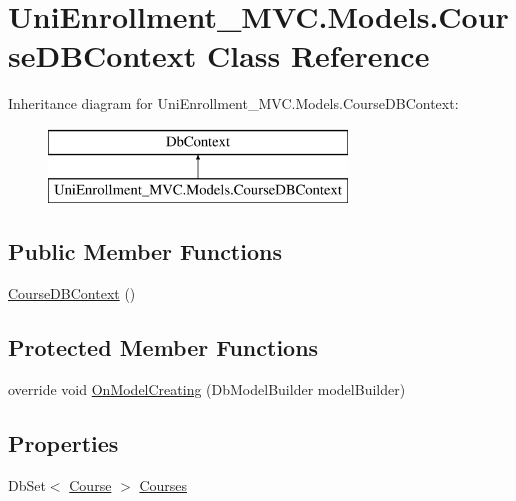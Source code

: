 \hypertarget{class_uni_enrollment___m_v_c_1_1_models_1_1_course_d_b_context}{}\section{Uni\+Enrollment\+\_\+\+M\+V\+C.\+Models.\+Course\+D\+B\+Context Class Reference}
\label{class_uni_enrollment___m_v_c_1_1_models_1_1_course_d_b_context}
Inheritance diagram for Uni\+Enrollment\+\_\+\+M\+V\+C.\+Models.\+Course\+D\+B\+Context\+:\begin{figure}[H]
\begin{center}
\leavevmode
\includegraphics[height=2.000000cm]{class_uni_enrollment___m_v_c_1_1_models_1_1_course_d_b_context}
\end{center}
\end{figure}
\subsection*{Public Member Functions}
\begin{DoxyCompactItemize}
\item 
\hyperlink{class_uni_enrollment___m_v_c_1_1_models_1_1_course_d_b_context_a2c8fbc695a4f7ab1435fe0e5bb7feb76}{Course\+D\+B\+Context} ()
\end{DoxyCompactItemize}
\subsection*{Protected Member Functions}
\begin{DoxyCompactItemize}
\item 
override void \hyperlink{class_uni_enrollment___m_v_c_1_1_models_1_1_course_d_b_context_a0fe32c3c10feabfa9b142fa3a3703452}{On\+Model\+Creating} (Db\+Model\+Builder model\+Builder)
\end{DoxyCompactItemize}
\subsection*{Properties}
\begin{DoxyCompactItemize}
\item 
Db\+Set$<$ \hyperlink{class_uni_enrollment___m_v_c_1_1_models_1_1_course}{Course} $>$ \hyperlink{class_uni_enrollment___m_v_c_1_1_models_1_1_course_d_b_context_ae3387c6f33aaa416639b69b2cc34fba0}{Courses}
\end{DoxyCompactItemize}


